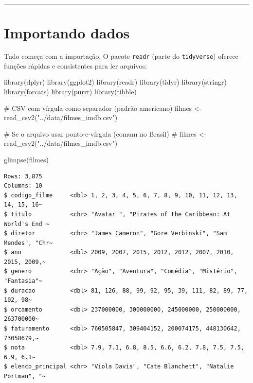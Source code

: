 \documentclass[
  letterpaper,
]{scrbook}
\newenvironment{Shaded}{\begin{snugshade}}{\end{snugshade}}
\newcommand{\CommentTok}[1]{\textcolor[rgb]{0.37,0.37,0.37}{#1}}
\newcommand{\FunctionTok}[1]{\textcolor[rgb]{0.28,0.35,0.67}{#1}}
\newcommand{\NormalTok}[1]{\textcolor[rgb]{0.00,0.23,0.31}{#1}}
\newcommand{\OtherTok}[1]{\textcolor[rgb]{0.00,0.23,0.31}{#1}}
\newcommand{\StringTok}[1]{\textcolor[rgb]{0.13,0.47,0.30}{#1}}
\begin{document}
\begin{center}\rule{0.5\linewidth}{0.5pt}\end{center}

\section{Importando dados}\label{importando-dados}

Tudo começa com a importação. O pacote \texttt{readr} (parte do
\texttt{tidyverse}) oferece funções rápidas e consistentes para ler
arquivos:

\begin{Shaded}
\begin{Highlighting}[]
\FunctionTok{library}\NormalTok{(dplyr)}
\FunctionTok{library}\NormalTok{(ggplot2)}
\FunctionTok{library}\NormalTok{(readr)}
\FunctionTok{library}\NormalTok{(tidyr)}
\FunctionTok{library}\NormalTok{(stringr)}
\FunctionTok{library}\NormalTok{(forcats)}
\FunctionTok{library}\NormalTok{(purrr)}
\FunctionTok{library}\NormalTok{(tibble)}

\CommentTok{\# CSV com vírgula como separador (padrão americano)}
\NormalTok{filmes }\OtherTok{\textless{}{-}} \FunctionTok{read\_csv2}\NormalTok{(}\StringTok{"../data/filmes\_imdb.csv"}\NormalTok{)}

\CommentTok{\# Se o arquivo usar ponto{-}e{-}vírgula (comum no Brasil)}
\CommentTok{\# filmes \textless{}{-} read\_csv2("../data/filmes\_imdb.csv")}
\end{Highlighting}
\end{Shaded}

\begin{Shaded}
\begin{Highlighting}[]
\FunctionTok{glimpse}\NormalTok{(filmes)}
\end{Highlighting}
\end{Shaded}

\begin{verbatim}
Rows: 3,875
Columns: 10
$ codigo_filme     <dbl> 1, 2, 3, 4, 5, 6, 7, 8, 9, 10, 11, 12, 13, 14, 15, 16~
$ titulo           <chr> "Avatar ", "Pirates of the Caribbean: At World's End ~
$ diretor          <chr> "James Cameron", "Gore Verbinski", "Sam Mendes", "Chr~
$ ano              <dbl> 2009, 2007, 2015, 2012, 2012, 2007, 2010, 2015, 2009,~
$ genero           <chr> "Ação", "Aventura", "Comédia", "Mistério", "Fantasia"~
$ duracao          <dbl> 81, 126, 88, 99, 92, 95, 39, 111, 82, 89, 77, 102, 98~
$ orcamento        <dbl> 237000000, 300000000, 245000000, 250000000, 263700000~
$ faturamento      <dbl> 760505847, 309404152, 200074175, 448130642, 73058679,~
$ nota             <dbl> 7.9, 7.1, 6.8, 8.5, 6.6, 6.2, 7.8, 7.5, 7.5, 6.9, 6.1~
$ elenco_principal <chr> "Viola Davis", "Cate Blanchett", "Natalie Portman", "~
\end{verbatim}
\end{document}
